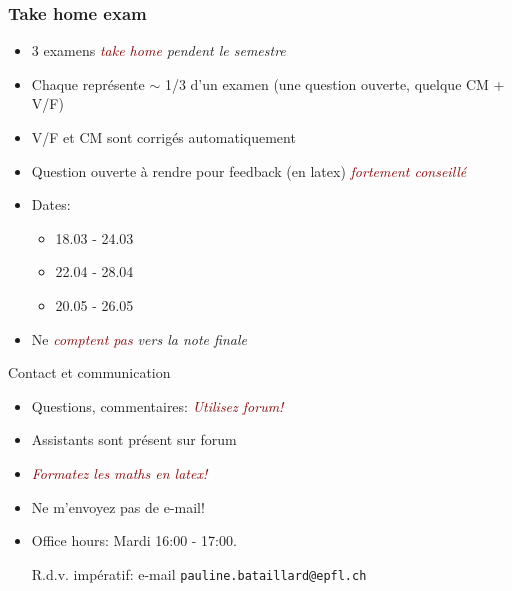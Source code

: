 \documentclass[t,aspectratio=149,mathserif]{beamer}
\newcommand{\myemph}[1]{\em \textcolor{darkred}{#1}}
\begin{document}
    \begin{frame}
     \frametitle{Take home exam} 
     \begin{itemize}
     \item 3 examens \myemph{take home} pendent le semestre
     \item Chaque représente $∼$ 1/3 d'un examen (une question ouverte, quelque CM + V/F)
     \item V/F et CM sont corrigés automatiquement
     \item Question ouverte à rendre pour feedback (en latex)  \myemph{fortement conseillé} 
     \item Dates:
       \begin{itemize}
       \item 18.03 - 24.03
       \item 22.04 - 28.04
       \item 20.05 - 26.05
       \end{itemize}
     \item Ne \myemph{comptent pas} vers la note finale 
     \end{itemize}
   \end{frame}

   \begin{frame}{Contact et communication}

     \begin{itemize}
     \item Questions, commentaires: \myemph{Utilisez forum!}
     \item Assistants sont présent sur forum 
     \item \myemph{Formatez les maths en latex!} 
     \item Ne m'envoyez pas de  e-mail! 
     \item Office hours: Mardi 16:00 - 17:00.

       
      R.d.v. impératif: e-mail  {\tt pauline.bataillard@epfl.ch  }
     \end{itemize}
     
   \end{frame}
 
\end{document}

